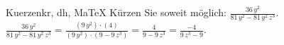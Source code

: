 \begin{MAufgabe}{Kuerzen}{kr, dh, MaTeX}
K\"urzen Sie soweit m\"oglich: $\frac{36\, y^2}{81\, y^2 - 81\, y^2\, z^3}$.\\ 
\ifLsg\MLoesung
\quad $\frac{36\, y^2}{81\, y^2 - 81\, y^2\, z^3}=\frac{(9\, y^2)\cdot(4)}{(9\, y^2)\cdot(9 - 9\, z^3)}=\frac{4}{9 - 9\, z^3}=\frac{-4}{9\, z^3 - 9}$.\else\relax\fi
 \end{MAufgabe}